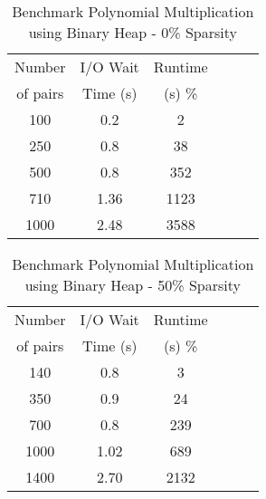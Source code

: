 \documentclass[11pt, one-sided]{amsart}
\begin{document}
\newpage


\begin{table}[htbp]
   \centering
      \caption{Benchmark Polynomial Multiplication using Binary Heap - 0\% Sparsity}
   \begin{tabular}{|c|c|c|c|c|c|}
   	\hline
		 Number   & I/O Wait		& Runtime 	 \\ 
		 of pairs 	&Time (s)		&	(s)		 		\%				\\ \hline
		100 		&	0.2		&	2					\\
		 250		&	0.8		&	38					\\
		500		&	0.8		&	352					\\
		710		&	1.36		&	1123					\\
		1000		&	2.48		&	3588					\\
	\hline
   \end{tabular}
   \label{tab:booktabs}
\end{table}



\begin{table}[htbp]
   \centering
      \caption{Benchmark Polynomial Multiplication using Binary Heap - 50\% Sparsity}
   \begin{tabular}{|c|c|c|c|c|c|}
   	\hline
		 Number   & I/O Wait		& Runtime 	 \\ 
		 of pairs 	&Time (s)		&	(s)		 		\%				\\ \hline
		140 		&	0.8		&	3					\\
		 350		&	0.9		&	24					\\
		700		&	0.8		&	239					\\
		1000		&	1.02		&	689					\\
		1400		&	2.70		&	2132					\\
	\hline
   \end{tabular}
   \label{tab:booktabs}
\end{table}
\end{document}
